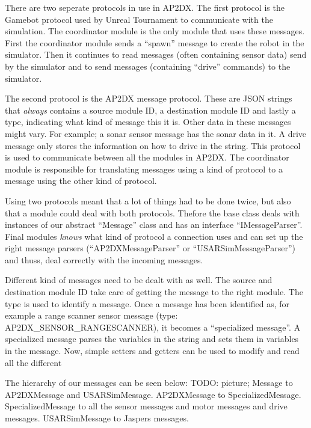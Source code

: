 There are two seperate protocols in use in AP2DX. The first protocol is the Gamebot protocol 
used by Unreal Tournament to communicate with the simulation. The coordinator module is the 
only module that uses these messages. First the coordinator module sends a ``spawn'' message 
to create the robot in the simulator. Then it continues to read messages (often containing 
sensor data) send by the simulator and to send messages (containing ``drive'' commands) to
the simulator. 

The second protocol is the AP2DX message protocol. These are JSON strings that \emph{always}
contains a source module ID, a destination module ID and lastly a type, indicating what kind
of message this it is. Other data in these messages might vary. For example; a sonar sensor
message has the sonar data in it. A drive message only stores the information on how to drive
in the string. 
This protocol is used to communicate between all the modules in 
AP2DX.  The coordinator module is responsible for translating messages using a kind of
protocol to a message using the other kind of protocol.

Using two protocols meant that a lot of things had to be done twice, but also that a module 
could deal with both protocols. Thefore the 
base class deals with instances
of our abstract ``Message'' class and has an interface ``IMessageParser''. Final modules \emph{knows}
what kind of protocol a connection uses and can set up the right message parsers (``AP2DXMessageParser'' 
or ``USARSimMessageParser'') and thuss, deal correctly with the incoming messages. 

Different kind of messages need to be dealt with as well. The source and destination module ID take care
of getting the message to the right module. The type is used to identify a message. Once a message
has been identified as, for example a range scanner sensor message (type: AP2DX\_SENSOR\_RANGESCANNER), 
it becomes a ``specialized message''. 
A specialized message parses the variables in the string and sets them in variables in the message. Now,
simple setters and getters can be used to modify and read all the different 

The hierarchy of our messages can be seen below: 
TODO: picture; Message to AP2DXMessage and USARSimMessage. AP2DXMessage to SpecializedMessage. SpecializedMessage
to all the sensor messages and motor messages and drive messages. USARSimMessage to Jaspers messages. 

